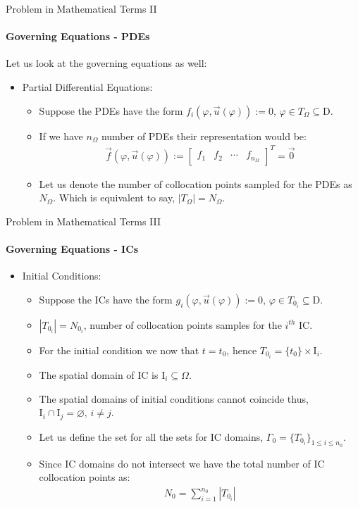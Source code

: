 \documentclass{beamer}
\begin{document}
\begin{frame}{Problem in Mathematical Terms II}
\framesubtitle{Governing Equations - PDEs}    
Let us look at the governing equations as well:
\begin{itemize}
    \item Partial Differential Equations:
    \begin{itemize}
        \item Suppose the PDEs have the form $f_i(\varphi, \vec{u}(\varphi)) := 0$, $\varphi \in T_\Omega \subseteq \mathrm{D}.$
        \item If we have $n_\Omega$ number of PDEs their representation would be:
        \begin{align}
           \vec{f}(\varphi, \vec{u}(\varphi)) := \begin{bmatrix} f_1 & f_2 & \cdots & f_{n_\Omega}\end{bmatrix}^T = \vec{0} 
        \end{align}
        \item Let us denote the number of collocation points sampled for the PDEs as $N_\Omega$. Which is equivalent to say, $\left|T_\Omega\right|  = N_\Omega$.
    \end{itemize}
\end{itemize}
\end{frame}

\begin{frame}{Problem in Mathematical Terms III}
\framesubtitle{Governing Equations - ICs}

\begin{itemize}
    \item Initial Conditions:
    \begin{itemize}
        \item Suppose the ICs have the form $g_i(\varphi, \vec{u}(\varphi)) := 0$, $\varphi \in T_{0_i} \subseteq \mathrm{D}.$
        \item $\left|T_{0_i}\right| = N_{0_i}$, number of collocation points samples for the $i^{th}$ IC.
        \item For the initial condition we now that $t = t_0$, hence $T_{0_i} = \{t_0\} \times \mathrm{I}_i$.
        \item The spatial domain of IC is $\mathrm{I}_i \subseteq \Omega$.
        \item The spatial domains of initial conditions cannot coincide thus, $ \mathrm{I}_i \cap \mathrm{I}_j = \varnothing,\, i \neq j$.
        \item Let us define the set for all the sets for IC domains, $\Gamma_0 = \{T_{0_i}\}_{1\leq i \leq n_0}$.
        \item Since IC domains do not intersect we have the total number of IC collocation points as:
        \begin{align*}
            N_0 = \sum \limits_{i=1}^{n_0}\left|T_{0_i}\right|
        \end{align*}
    \end{itemize}
\end{itemize}
    
\end{frame}
\end{document}
